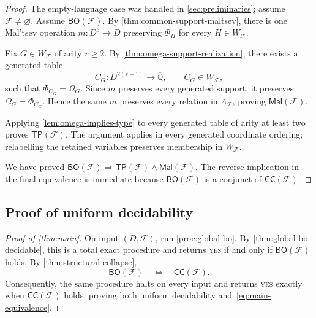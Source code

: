 \documentclass[11pt]{article}
\theoremstyle{plain}
\theoremstyle{definition}
\theoremstyle{remark}
\newcommand{\AlgNums}{\overline{\mathbb Q}}
\newcommand{\cF}{\mathcal F}
\newcommand{\CC}{\mathsf{CC}}
\newcommand{\BO}{\mathsf{BO}}
\newcommand{\TP}{\mathsf{TP}}
\newcommand{\Mal}{\mathsf{Mal}}
\newcommand{\SuppRel}[1]{\Phi_{#1}}
\newcommand{\RowEq}[1]{\Omega_{#1}}
\newcommand{\YES}{\textnormal{\textsc{yes}}}
\begin{document}
\begin{proof}
The empty-language case was handled in \cref{sec:preliminaries}; assume
$\cF\ne\varnothing$.
Assume $\BO(\cF)$.  By \cref{thm:common-support-maltsev}, there is one
Mal'tsev operation $m:D^3\to D$ preserving $\SuppRel H$ for every
$H\in W_{\cF}$.

Fix $G\in W_{\cF}$ of arity $r\ge2$.  By
\cref{thm:omega-support-realization}, there exists a generated table
\[
  C_G:D^{2(r-1)}\to\AlgNums,
  \qquad C_G\in W_{\cF},
\]
such that $\SuppRel{C_G}=\RowEq G$.  Since $m$ preserves every generated
support, it preserves $\RowEq G=\SuppRel{C_G}$.  Hence the same $m$ preserves
every relation in $\Lambda_{\cF}$, proving $\Mal(\cF)$.

Applying \cref{lem:omega-implies-type} to every generated table of arity at
least two proves $\TP(\cF)$.  The argument applies in every generated
coordinate ordering; relabelling the retained variables preserves membership
in $W_{\cF}$.

We have proved $\BO(\cF)\Rightarrow\TP(\cF)\wedge\Mal(\cF)$.  The reverse
implication in the final equivalence is immediate because $\BO(\cF)$ is a
conjunct of $\CC(\cF)$.
\end{proof}

\subsection{Proof of uniform decidability}

\begin{proof}[Proof of \cref{thm:main}]
On input $(D,\cF)$, run \cref{proc:global-bo}.  By
\cref{thm:global-bo-decidable}, this is a total exact procedure and returns
\YES{} if and only if $\BO(\cF)$ holds.  By
\cref{thm:structural-collapse},
\[
  \BO(\cF)\quad\Longleftrightarrow\quad\CC(\cF).
\]
Consequently, the same procedure halts on every input and returns
\YES{} exactly when $\CC(\cF)$ holds, proving both uniform
decidability and~\eqref{eq:main-equivalence}.
\end{proof}
\end{document}
